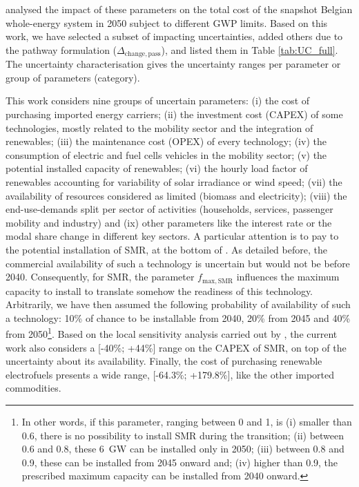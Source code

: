 \citet{rixhon2021role} analysed the impact of these parameters on the total cost of the snapshot Belgian whole-energy system in 2050 subject to different \gls{GWP} limits. Based on this work, we have selected a subset of impacting uncertainties, added others due to the pathway formulation (\eg $\Delta_{\mathrm{change,pass}}$), and listed them in Table \ref{tab:UC_full}. The uncertainty characterisation gives the uncertainty ranges per parameter or group of parameters (category).

This work considers nine groups of uncertain parameters: (i) the cost of purchasing imported energy carriers; (ii) the investment cost (\ie CAPEX) of some technologies, mostly related to the mobility sector and the integration of renewables; (iii) the maintenance cost (\ie OPEX) of every technology; (iv) the consumption of electric and fuel cells vehicles in the mobility sector; (v) the potential installed capacity of renewables; (vi) the hourly load factor of renewables accounting for variability of solar irradiance or wind speed; (vii) the availability of resources considered as limited (\ie biomass and electricity); (viii) the end-use-demands split per sector of activities (\ie households, services, passenger mobility and industry) and (ix) other parameters like the interest rate or the modal share change in different key sectors. A particular attention is to pay to the potential installation of \gls{SMR}, at the bottom of . As detailed before, the commercial availability of such a technology is uncertain but would not be before 2040. Consequently, for \gls{SMR}, the parameter $f_{\mathrm{max,SMR}}$ influences the maximum capacity to install to translate somehow the readiness of this technology. Arbitrarily, we have then assumed the following probability of availability of such a technology: 10\% of chance to be installable from 2040, 20\% from 2045 and 40\% from 2050\footnote{In other words, if this parameter, ranging between 0 and 1, is (i) smaller than 0.6, there is no possibility to install \gls{SMR} during the transition; (ii) between 0.6 and 0.8, these 6~GW can be installed only in 2050; (iii) between 0.8 and 0.9, these can be installed from 2045 onward and; (iv) higher than 0.9, the prescribed maximum capacity can be installed from 2040 onward. }. Based on the local sensitivity analysis carried out by \citet{PATHS2050}, the current work also considers a [-40\%; +44\%] range on the CAPEX of SMR, on top of the uncertainty about its availability. Finally, the cost of purchasing renewable electrofuels presents a wide range, [-64.3\%; +179.8\%], like the other imported commodities.

